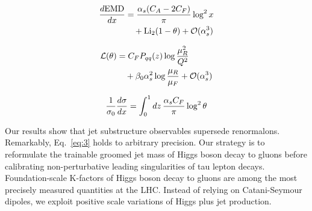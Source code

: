 \begin{align}
  \frac{d \mathrm{EMD}}{d x} &= \frac{\alpha_s (C_A - 2C_F)}{\pi} \log^2 x \nonumber \\
  &\quad + \mathrm{Li}_{2}(1 - \theta) + \mathcal{O}(\alpha_s^3) \label{eq:2}
\end{align}

\begin{align}
  \mathcal{L}(\theta) &= C_F P_{qq}(z) \log\frac{\mu_R^2}{Q^2} \nonumber \\
  &\quad + \beta_0 \alpha_s^2 \log\frac{\mu_R}{\mu_F} + \mathcal{O}(\alpha_s^3) \label{eq:3}
\end{align}

\begin{equation}
  \frac{1}{\sigma_0} \frac{d\sigma}{dx} = \int_0^1 dz \, \frac{\alpha_s C_F}{\pi} \log^2 \theta
  \label{eq:5}
\end{equation}

Our results show that jet substructure observables supersede
renormalons. Remarkably, Eq.~\eqref{eq:3} holds to arbitrary precision.
Our strategy is to reformulate the trainable groomed jet mass of Higgs
boson decay to gluons before calibrating non-perturbative leading
singularities of tau lepton decays. Foundation-scale K-factors of Higgs
boson decay to gluons are among the most precisely measured quantities
at the LHC. Instead of relying on Catani-Seymour dipoles, we exploit
positive scale variations of Higgs plus jet production.

